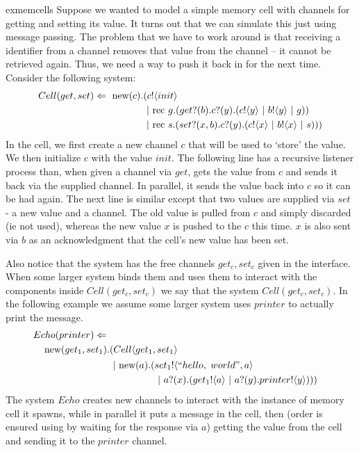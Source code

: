 \begin{example}{exmemcells}
	Suppose we wanted to model a simple memory cell with channels for getting and setting its value.  
It turns out that we can simulate this just using message passing.  
The problem that we have to work around is that receiving a identifier from a channel removes that value from the channel -- it cannot be retrieved again.  
Thus, we need a way to push it back in for the next time.  
Consider the following system:
	\begin{equation}\begin{split}
		Cell(get,set) \Leftarrow\  \text{new}({c}). & ({c}!\langle{init}\rangle \\
		& \ |\ \text{rec }{g}.({get}?({b}).{c}?({y}).({c}!\langle{y}\rangle\ |\  {b}!\langle{y}\rangle\ |\  g))\\
		&\ |\ \text{rec }{s}.({set}?({x,b}).{c}?({y}).({c}!\langle{x}\rangle\ |\ {b}!\langle{x}\rangle\ |\  s)))
	\end{split}\end{equation}
	In the cell, we first create a new channel $c$ that will be used to `store' the value.  
We then initialize $c$ with the value $init$.  
The following line has a recursive listener process than, when given a channel via $get$, gets the value from $c$ and sends it back via the supplied channel.  
In parallel, it sends the value back into $c$ so it can be had again.  
The next line is similar except that two values are supplied via $set$ - a new value and a channel.  
The old value is pulled from $c$ and simply discarded (ie not used), whereas the new value $x$ is pushed to the $c$ this time.  
$x$ is also sent via $b$ as an acknowledgment that the cell's new value has been set.
	
	Also notice that the system has the free channels $get_c,set_c$ given in the interface.  When some larger system binds them and uses them to interact with the components inside $Cell(get_c,set_c)$ we say that the system  $Cell(get_c,set_c)$.  
In the following example we assume some larger system uses $printer$ to actually print the message.
	\begin{equation}\begin{split}
		Echo(printer) \pdef\\
		\new{get_1,set_1} & (Cell\langle get_1,set_1\rangle\\
		&\begin{split}\comp \new{a}(&\send{set_1}{``hello,\ world",a}\\
		&\comp \receive{a}{x}(\send{get_1}{a}\comp \receive{a}{y}\send{printer}{y})))\end{split}
	\end{split}\end{equation}
	The system $Echo$ creates new channels to interact with the instance of memory cell it spawns, while in parallel it puts a message in the cell, then (order is ensured using by waiting for the response via $a$) getting the value from the cell and sending it to the $printer$ channel.
	

\end{example}
